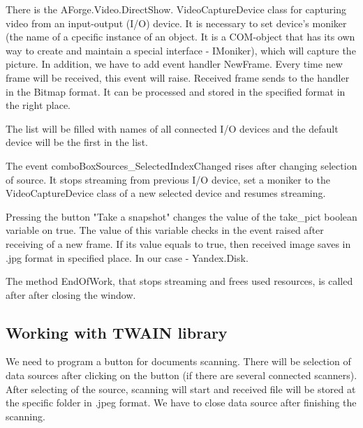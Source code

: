 \documentclass[12pt,journal,compsoc]{D:/Магистратура/English/bare_conf/IEEEtran}
\begin{document}
There is the AForge.Video.DirectShow. VideoCaptureDevice class for capturing video from an input-output (I/O) device. It is necessary to set device's moniker (the name of a cpecific instance of an object. It is a COM-object that has its own way to create and maintain a special interface - IMoniker), which will capture the picture. In addition, we have to add event handler NewFrame. Every time new frame will be received, this event will raise. Received frame sends to the handler in the Bitmap format. It can be processed and stored in the specified format in the right place.

The list will be filled with names of all connected I/O devices and the default device will be the first in the list.

The event comboBoxSources\_SelectedIndexChanged rises after changing selection of source. It stops streaming from previous I/O device, set a moniker to the VideoCaptureDevice class of a new selected device and resumes streaming.

Pressing the button "Take a snapshot" changes the value of the take\_pict boolean variable on true. The value of this variable checks in the event raised after receiving of a new frame. If its value equals to true, then received image saves in .jpg format in specified place. In our case - Yandex.Disk.

The method EndOfWork, that stops streaming and frees used resources, is called after after closing the window.

\subsection{Working with TWAIN library}
We need to program a button for documents scanning. There will be selection of data sources after clicking on the button (if there are several connected scanners). After selecting of the source, scanning will start and received file will be stored at the specific folder in .jpeg format. We have to close data source after finishing the scanning.
\end{document}
